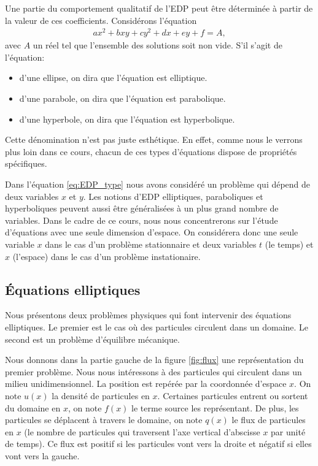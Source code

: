 \documentclass[12pt,a4paper,twoside]{article}
\begin{document}
Une partie du comportement qualitatif de l'EDP peut \^etre d\'etermin\'ee
\`a partir de la valeur de ces coefficients.
Consid\'erons l'\'equation
\begin{align}
  \label{eq:EDP_geom}
  a x^2 + b xy + c y^2 + d x + e y + f = A ,
\end{align}
avec $A$ un r\'eel tel que l'ensemble des solutions soit non vide.
S'il s'agit de l'\'equation:
\begin{itemize}
\item d'une ellipse, on dira que l'\'equation est elliptique.
\item d'une parabole, on dira que l'\'equation est parabolique.
\item d'une hyperbole, on dira que l'\'equation est hyperbolique.
\end{itemize}
Cette d\'enomination n'est pas juste esth\'etique.
En effet, comme nous le verrons plus loin dans ce cours,
chacun de ces types d'\'equations dispose de propri\'et\'es sp\'ecifiques.

Dans l'\'equation \eqref{eq:EDP_type}
nous avons consid\'er\'e un probl\`eme qui d\'epend de deux
variables $x$ et $y$. 
Les notions d'EDP elliptiques, paraboliques et hyperboliques peuvent
aussi \^etre g\'en\'eralis\'ees \`a un plus grand nombre de variables.
Dans le cadre de ce cours, nous nous concentrerons 
sur l'\'etude d'\'equations
avec une seule dimension d'espace.
On consid\'erera donc une seule variable $x$ dans le cas d'un probl\`eme stationnaire
et deux variables $t$ (le temps) et $x$ (l'espace) dans le cas d'un probl\`eme
instationaire.


\subsection{\'Equations elliptiques}
\label{subsec:elliptique}

Nous pr\'esentons deux probl\`emes physiques qui font intervenir
des \'equations elliptiques.
Le premier est le cas o\`u des particules circulent dans un domaine.
Le second est un probl\`eme d'\'equilibre m\'ecanique.


Nous donnons dans la partie gauche de la figure \ref{fig:flux} 
une repr\'esentation du premier probl\`eme.
Nous nous int\'eressons \`a des particules qui circulent 
dans un milieu unidimensionnel. La position est
rep\'er\'ee par la coordonn\'ee d'espace $x$. On note $u(x)$ la densit\'e
de particules en $x$. Certaines particules entrent ou sortent du domaine
en $x$, on note $f(x)$ le terme source les repr\'esentant.
De plus, les particules se d\'eplacent \`a travers le domaine,
on note $q(x)$ le flux de particules en $x$
(le nombre de particules qui traversent l'axe vertical d'abscisse $x$
par unit\'e de temps). Ce flux est positif si les particules 
vont vers la droite et n\'egatif si elles vont vers la gauche.
\end{document}
